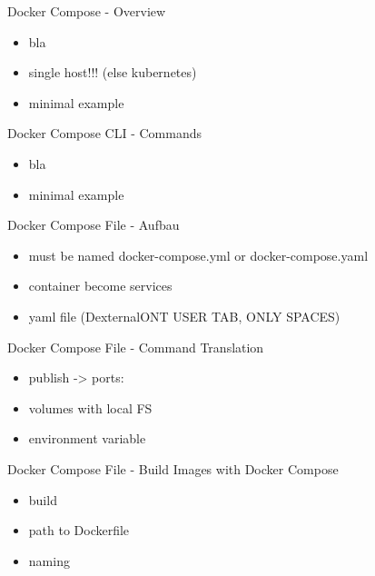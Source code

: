 \documentclass[10pt,aspectratio=\ratio,
compress
]{beamer}
\begin{document}
\begin{frame}{Docker Compose - Overview}

\begin{itemize}
	\item bla
	\item single host!!! (else kubernetes)
	\item minimal example
\end{itemize}
\end{frame}

\begin{frame}{Docker Compose CLI - Commands}

\begin{itemize}
	\item bla
	\item minimal example
\end{itemize}
\end{frame}

\begin{frame}{Docker Compose File - Aufbau}

\begin{itemize}
	\item must be named docker-compose.yml or docker-compose.yaml
	\item container become services
	\item yaml file (DexternalONT USER TAB, ONLY SPACES)
\end{itemize}
\end{frame}

\begin{frame}{Docker Compose File - Command Translation}

\begin{itemize}
	\item publish -> ports:
	\item volumes with local FS
	\item environment variable
\end{itemize}
\end{frame}

\begin{frame}{Docker Compose File - Build Images with Docker Compose}

\begin{itemize}
	\item build
	\item path to Dockerfile
	\item naming
\end{itemize}
\end{frame}
\end{document}
